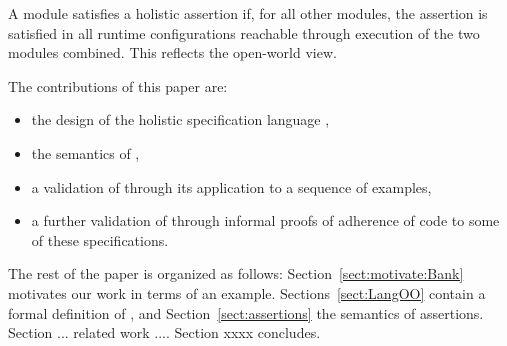 A module satisfies a holistic assertion if, for all other modules,
  the assertion is satisfied  in all runtime configurations reachable through execution of the two modules combined.
  This reflects the open-world view.


\noindent The contributions of this paper are:
\begin{itemize}
\item the design of the holistic specification language \Chainmail,
\item the semantics of \Chainmail,
\item a validation of \Chainmail through its application to a sequence of examples,
\item a further validation of \Chainmail through informal proofs of adherence of code to some of these specifications.
\end{itemize}  
  
  
The rest of the paper is organized as follows: Section~\ref{sect:motivate:Bank} 
motivates our work in terms of an example. Sections~\ref{sect:LangOO} contain a formal definition of \LangOO, and Section~\ref{sect:assertions} the semantics of assertions. Section ... related work .... Section xxxx concludes.

